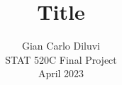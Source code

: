 \documentclass{article}
\title{Title}
\author{%
  Gian Carlo Diluvi \\
  STAT 520C Final Project \\
  April 2023
}
\begin{document}
\onehalfspacing
\maketitle




\clearpage
\small





\end{document}
